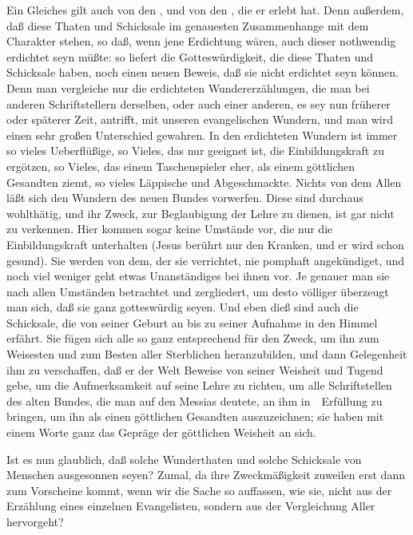\begin{aufza}
\item Ein Gleiches gilt auch von den , und von den , die er erlebt hat. Denn außerdem, daß diese Thaten und Schicksale im genauesten Zusammenhange mit dem Charakter  stehen, so daß, wenn jene Erdichtung wären, auch dieser nothwendig erdichtet seyn müßte: so liefert die Gotteswürdigkeit, die diese Thaten und Schicksale haben, noch einen neuen Beweis, daß sie nicht erdichtet seyn können. Denn man vergleiche nur die erdichteten Wundererzählungen, die man bei anderen Schriftstellern derselben, oder auch einer anderen, es sey nun früherer oder späterer Zeit, antrifft, mit unseren evangelischen Wundern, und man wird einen sehr großen Unterschied gewahren. In den erdichteten Wundern ist immer so vieles Ueberflüßige, so Vieles, das nur geeignet ist, die Einbildungskraft zu ergötzen, so Vieles, das einem Taschenspieler eher, als einem göttlichen Gesandten ziemt, so vieles Läppische und Abgeschmackte. Nichts von dem Allen läßt sich den Wundern des neuen Bundes vorwerfen. Diese sind durchaus wohlthätig, und ihr Zweck, zur Beglaubigung der Lehre  zu dienen, ist gar nicht zu verkennen. Hier kommen sogar keine Umstände vor, die nur die Einbildungskraft unterhalten (Jesus berührt nur den Kranken, und er wird schon gesund). Sie werden von dem, der sie verrichtet, nie pomphaft angekündiget, und noch viel weniger geht etwas Unanständiges bei ihnen vor. Je genauer man sie nach allen Umständen betrachtet und zergliedert, um desto völliger überzeugt man sich, daß sie ganz gotteswürdig seyen. Und eben dieß sind auch die Schicksale, die  von seiner Geburt an bis zu seiner Aufnahme in den Himmel erfährt. Sie fügen sich alle so ganz entsprechend für den Zweck, um ihn zum Weisesten und zum Besten aller Sterblichen heranzubilden, und dann Gelegenheit ihm zu verschaffen, daß er der Welt Beweise von seiner Weisheit und Tugend gebe, um die Aufmerksamkeit auf seine Lehre zu richten, um alle Schriftstellen des alten Bundes, die man auf den Messias deutete, an ihm in~\ Erfüllung zu bringen, um ihn als einen göttlichen Gesandten auszuzeichnen; sie haben mit einem Worte ganz das Gepräge der göttlichen Weisheit an sich.
\item Ist es nun glaublich, daß solche Wunderthaten und solche Schicksale von Menschen ausgesonnen seyen? Zumal, da ihre Zweckmäßigkeit zuweilen erst dann zum Vorscheine kommt, wenn wir die Sache so auffassen, wie sie, nicht aus der Erzählung eines einzelnen Evangelisten, sondern aus der Vergleichung Aller hervorgeht?
\end{aufza}
